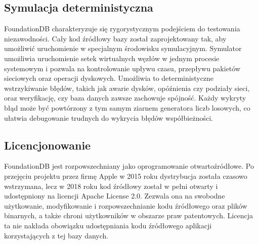 \subsection{Symulacja deterministyczna}
FoundationDB charakteryzuje się rygorystycznym podejściem do testowania niezawodności. Cały kod źródłowy bazy został zaprojektowany tak, aby umożliwić uruchomienie w specjalnym środowisku symulacyjnym. Symulator umożliwia uruchomienie setek wirtualnych węzłów w jednym procesie systemowym i pozwala na kontrolowanie upływu czasu, przepływu pakietów sieciowych oraz operacji dyskowych. Umożliwia to deterministyczne wstrzykiwanie błędów, takich jak awarie dysków, opóźnienia czy podziały sieci, oraz weryfikację, czy baza danych zawsze zachowuje spójność. Każdy wykryty błąd może być powtórzony z tym samym ziarnem generatora liczb losowych, co ułatwia debugowanie trudnych do wykrycia błędów współbieżności.

\subsection{Licencjonowanie}
FoundationDB jest rozpowszechniany jako oprogramowanie otwartoźródłowe. Po przejęciu projektu przez firmę Apple w 2015 roku dystrybucja została czasowo wstrzymana, lecz w 2018 roku kod źródłowy został w pełni otwarty i udostępniony na licencji Apache License 2.0. Zezwala ona na swobodne użytkowanie, modyfikowanie i rozpowszechnianie kodu źródłowego oraz plików binarnych, a także chroni użytkowników w obszarze praw patentowych. Licencja ta nie nakłada obowiązku udostępniania kodu źródłowego aplikacji korzystających z tej bazy danych.

